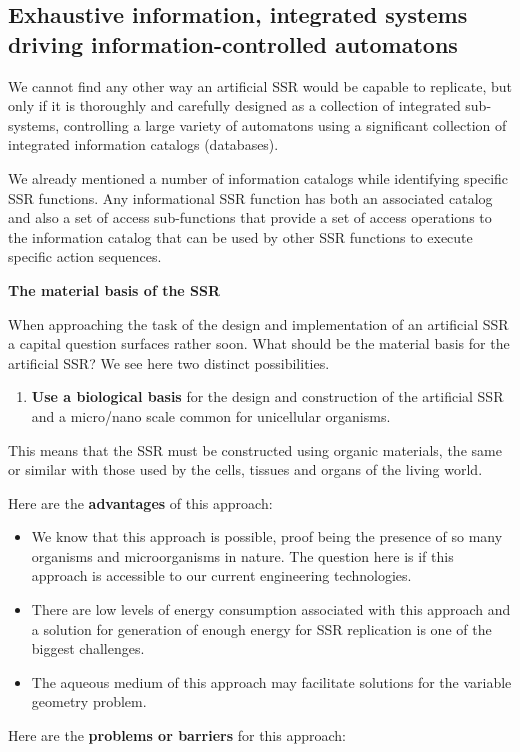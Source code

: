 \bigskip

\subsection[Exhaustive information, integrated systems driving
information{}-controlled automatons]{Exhaustive information, integrated
systems driving information-controlled automatons}
\hypertarget{RefHeading3122306210128}{}\label{bkm:Ref348984751}We cannot
find any other way an artificial SSR would be capable to replicate, but
only if it is thoroughly and carefully designed as a collection of
integrated sub-systems, controlling a large variety of automatons using
a significant collection of integrated information catalogs
(databases).


\bigskip

We already mentioned a number of information catalogs while identifying
specific SSR functions. Any informational SSR function has both an
associated catalog and also a set of access sub-functions that provide
a set of access operations to the information catalog that can be used
by other SSR functions to execute specific action sequences.


\bigskip

{\bfseries
\hypertarget{RefHeading3124306210128}{}The material basis of the SSR}

When approaching the task of the design and implementation of an
artificial SSR a capital question surfaces rather soon. What should be
the material basis for the artificial SSR? We see here two distinct
possibilities.


\bigskip

\begin{enumerate}
\item \textbf{Use a biological basis} for the design and construction of
the artificial SSR and a micro/nano scale common for unicellular
organisms. 
\end{enumerate}
This means that the SSR must be constructed using organic materials, the
same or similar with those used by the cells, tissues and organs of the
living world.

Here are the \textbf{advantages} of this approach:


\bigskip

\begin{itemize}
\item We know that this approach is possible, proof being the presence
of so many organisms and microorganisms in nature. The question here is
if this approach is accessible to our current engineering technologies.
\item There are low levels of energy consumption associated with this
approach and a solution for generation of enough energy for SSR
replication is one of the biggest challenges.
\item The aqueous medium of this approach may facilitate solutions for
the variable geometry problem.
\end{itemize}
Here are the \textbf{problems or barriers} for this approach:


